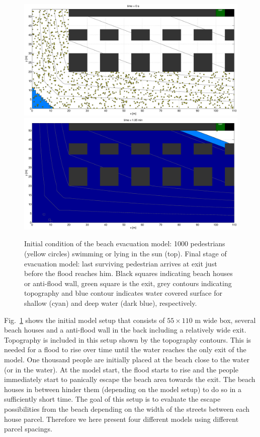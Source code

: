 \documentclass[11pt]{article}
\begin{document}
\begin{figure}
	\centering
	\includegraphics[width=1.1\textwidth]{figures/BeachEvacuationOneExitStreetWidth7_Flood0_1_000000.eps}
		\qquad
	\includegraphics[width=1.1\textwidth]{figures/BeachEvacuationOneExitStreetWidth7_Flood0_1_006300.eps}
	\caption{Initial condition of the beach evacuation model: 1000 pedestrians (yellow circles) swimming or lying in the sun (top). Final stage of evacuation model: last surviving pedestrian arrives at exit just before the flood reaches him. Black squares indicating beach houses or anti-flood wall, green square is the exit, grey contours indicating topography and blue contour indicates water covered surface for shallow (cyan) and deep water (dark blue), respectively.}
	\label{fig:beach_initial}
\end{figure}

Fig.~\ref{fig:beach_initial} shows the initial model setup that consists of $55\times110$ m wide box, several beach houses and a anti-flood wall in the back including a relatively wide exit. Topography is included in this setup shown by the topography contours. This is needed for a flood to rise over time until the water reaches the only exit of the model. One thousand people are initially placed at the beach close to the water (or in the water). At the model start, the flood starts to rise and the people immediately start to panically escape the beach area towards the exit. The beach houses in between hinder them (depending on the model setup) to do so in a sufficiently short time. The goal of this setup is to evaluate the escape possibilities from the beach depending on the width of the streets between each house parcel. Therefore we here present four different models using different parcel spacings.
\end{document}
